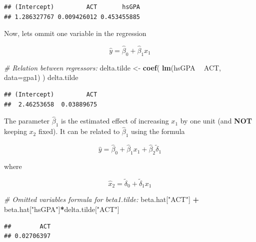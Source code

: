 \documentclass[]{book}
\newenvironment{Shaded}{\begin{snugshade}}{\end{snugshade}}
\newcommand{\CommentTok}[1]{\textcolor[rgb]{0.56,0.35,0.01}{\textit{#1}}}
\newcommand{\DataTypeTok}[1]{\textcolor[rgb]{0.13,0.29,0.53}{#1}}
\newcommand{\KeywordTok}[1]{\textcolor[rgb]{0.13,0.29,0.53}{\textbf{#1}}}
\newcommand{\NormalTok}[1]{#1}
\newcommand{\OperatorTok}[1]{\textcolor[rgb]{0.81,0.36,0.00}{\textbf{#1}}}
\newcommand{\StringTok}[1]{\textcolor[rgb]{0.31,0.60,0.02}{#1}}
\begin{document}
\begin{verbatim}
## (Intercept)         ACT       hsGPA 
## 1.286327767 0.009426012 0.453455885
\end{verbatim}

Now, lets ommit one variable in the regression

\begin{equation}
\hat{y} = \hat{\beta}_{0} + \hat{\beta}_{1}x_{1}    
\label{eq:lmomitted}
\end{equation}

\begin{Shaded}
\begin{Highlighting}[]
\CommentTok{# Relation between regressors:}
\NormalTok{delta.tilde <-}\StringTok{ }\KeywordTok{coef}\NormalTok{( }\KeywordTok{lm}\NormalTok{(hsGPA }\OperatorTok{~}\StringTok{ }\NormalTok{ACT, }\DataTypeTok{data=}\NormalTok{gpa1) )}
\NormalTok{delta.tilde}
\end{Highlighting}
\end{Shaded}

\begin{verbatim}
## (Intercept)         ACT 
##  2.46253658  0.03889675
\end{verbatim}

The parameter \(\hat\beta_1\) is the estimated effect of increasing
\(x_1\) by one unit (and \textbf{NOT} keeping \(x_2\) fixed). It can be
related to \(\hat\beta_1\) using the formula

\begin{equation}
\hat{y} = \hat{\beta}_{0} + \hat{\beta}_{1} x_{1} +  \hat{\beta}_{2}  \tilde\delta_{1}
\label{eq:lmommited}
\end{equation}

where

\begin{equation}
\hat{x}_2 = \tilde\delta_{0} + \tilde\delta_{1} x_{1}
\label{eq:lmomitted2}
\end{equation}

\begin{Shaded}
\begin{Highlighting}[]
\CommentTok{# Omitted variables formula for beta1.tilde:}
\NormalTok{beta.hat[}\StringTok{"ACT"}\NormalTok{] }\OperatorTok{+}\StringTok{ }\NormalTok{beta.hat[}\StringTok{"hsGPA"}\NormalTok{]}\OperatorTok{*}\NormalTok{delta.tilde[}\StringTok{"ACT"}\NormalTok{]}
\end{Highlighting}
\end{Shaded}

\begin{verbatim}
##        ACT 
## 0.02706397
\end{verbatim}
\end{document}
